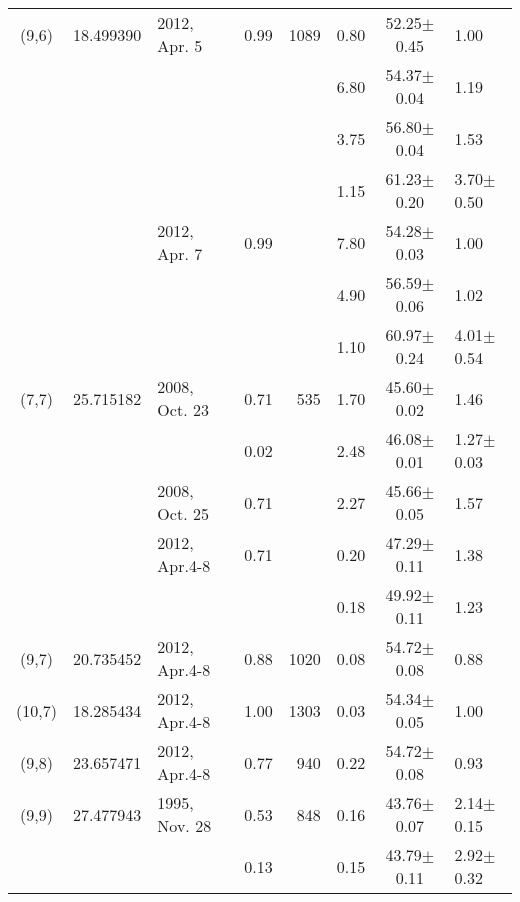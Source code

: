 \documentclass[oldversion]{aa}
\begin{document}
\begin{table*}
\begin{flushleft}
\begin{tabular}{cclcrccl}
  (9,6)   & 18.499390 & 2012, Apr. 5  &  0.99          &  1089           & 0.80  & 52.25$\pm$0.45 & 1.00             \\
          &           &               &                &                 & 6.80  & 54.37$\pm$0.04 & 1.19             \\
          &           &               &                &                 & 3.75  & 56.80$\pm$0.04 & 1.53             \\
          &           &               &                &                 & 1.15  & 61.23$\pm$0.20 & 3.70$\pm$0.50    \\
          &           & 2012, Apr. 7  &  0.99          &                 & 7.80  & 54.28$\pm$0.03 & 1.00             \\
          &           &               &                &                 & 4.90  & 56.59$\pm$0.06 & 1.02             \\
          &           &               &                &                 & 1.10  & 60.97$\pm$0.24 & 4.01$\pm$0.54    \\
  (7,7)   & 25.715182 & 2008, Oct. 23 &  0.71          &   535           & 1.70  & 45.60$\pm$0.02 & 1.46             \\
          &           &               &  0.02          &                 & 2.48  & 46.08$\pm$0.01 & 1.27$\pm$0.03    \\
          &           & 2008, Oct. 25 &  0.71          &                 & 2.27  & 45.66$\pm$0.05 & 1.57             \\
          &           & 2012, Apr.4-8 &  0.71          &                 & 0.20  & 47.29$\pm$0.11 & 1.38             \\
          &           &               &                &                 & 0.18  & 49.92$\pm$0.11 & 1.23             \\
  (9,7)   & 20.735452 & 2012, Apr.4-8 &  0.88          &  1020           & 0.08  & 54.72$\pm$0.08 & 0.88             \\
 (10,7)   & 18.285434 & 2012, Apr.4-8 &  1.00          &  1303           & 0.03  & 54.34$\pm$0.05 & 1.00             \\
  (9,8)   & 23.657471 & 2012, Apr.4-8 &  0.77          &   940           & 0.22  & 54.72$\pm$0.08 & 0.93             \\
  (9,9)   & 27.477943 & 1995, Nov. 28 &  0.53          &   848           & 0.16  & 43.76$\pm$0.07 & 2.14$\pm$0.15    \\
          &           &               &  0.13          &                 & 0.15  & 43.79$\pm$0.11 & 2.92$\pm$0.32    \\

\end{tabular}
\end{flushleft}
\end{table*}
\end{document}
